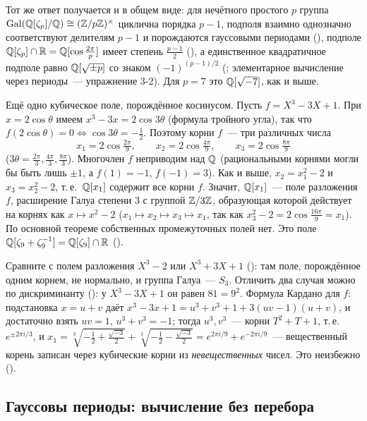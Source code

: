 Тот же ответ получается и в общем виде: для нечётного простого $p$ группа $\operatorname{Gal}(\mathbb Q[\zeta_p]/\mathbb Q)\cong(\mathbb Z/p\mathbb Z)^\times$ циклична порядка
$p-1$, подполя взаимно однозначно соответствуют делителям $p-1$ и порождаются гауссовыми периодами (), подполе
$\mathbb Q[\zeta_p]\cap\mathbb R=\mathbb Q[\cos\frac{2\pi}p]$ имеет степень $\frac{p-1}2$ (), а единственное квадратичное подполе равно
$\mathbb Q[\sqrt{\pm p}]$ со знаком $(-1)^{(p-1)/2}$ (; элементарное вычисление через периоды~--- упражнение 3-2). Для
$p=7$ это $\mathbb Q[\sqrt{-7}]$, как и выше.

\begin{example}[3.22a: многочлен $X^3-3X+1$]
Ещё одно кубическое поле, порождённое косинусом. Пусть $f=X^3-3X+1$. При $x=2\cos\theta$ имеем
$x^3-3x=2\cos3\theta$ (формула тройного угла), так что $f(2\cos\theta)=0\iff\cos3\theta=-\frac12$. Поэтому корни $f$~--- три
различных числа
\[
x_1=2\cos\tfrac{2\pi}9,\qquad x_2=2\cos\tfrac{4\pi}9,\qquad x_3=2\cos\tfrac{8\pi}9
\]
($3\theta=\frac{2\pi}3,\frac{4\pi}3,\frac{8\pi}3$). Многочлен $f$ неприводим над $\mathbb Q$ (рациональными корнями могли бы быть лишь
$\pm1$, а $f(1)=-1$, $f(-1)=3$). Как и выше, $x_2=x_1^2-2$ и $x_3=x_2^2-2$, т.\,е.\ $\mathbb Q[x_1]$ содержит все корни $f$. Значит,
$\mathbb Q[x_1]$~--- поле разложения $f$, расширение Галуа степени $3$ с группой $\mathbb Z/3\mathbb Z$, образующая которой действует на корнях
как $x\mapsto x^2-2$ ($x_1\mapsto x_2\mapsto x_3\mapsto x_1$, так как $x_3^2-2=2\cos\frac{16\pi}9=x_1$). По основной теореме
собственных промежуточных полей нет. Это поле $\mathbb Q[\zeta_9+\zeta_9^{-1}]=\mathbb Q[\zeta_9]\cap\mathbb R$ ().

Сравните с полем разложения $X^3-2$ или $X^3+3X+1$ (): там поле, порождённое одним корнем, не нормально, и
группа Галуа~--- $S_3$. Отличить два случая можно по дискриминанту (): у $X^3-3X+1$ он равен $81=9^2$. Формула Кардано
для $f$: подстановка $x=u+v$ даёт $x^3-3x+1=u^3+v^3+1+3(uv-1)(u+v)$, и достаточно взять $uv=1$, $u^3+v^3=-1$; тогда
$u^3,v^3$~--- корни $T^2+T+1$, т.\,е.\ $e^{\pm2\pi i/3}$, и
$x_1=\sqrt[3]{-\frac12+\frac{\sqrt{-3}}2}+\sqrt[3]{-\frac12-\frac{\sqrt{-3}}2}=e^{2\pi i/9}+e^{-2\pi i/9}$~--- вещественный
корень записан через кубические корни из \emph{невещественных} чисел. Это неизбежно ().
\end{example}

\subsection*{Гауссовы периоды: вычисление без перебора}

